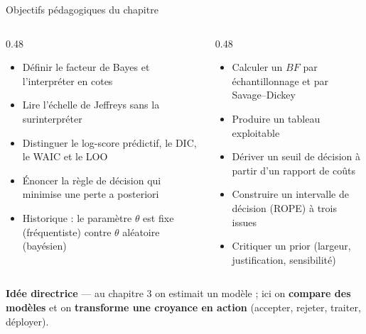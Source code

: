 \begin{frame}{Objectifs pédagogiques du chapitre}
\begin{columns}[t]
\begin{column}{0.48\textwidth}
\begin{kbox}[Savoirs]
\begin{itemize}
  \item Définir le facteur de Bayes et l'interpréter en cotes
  \item Lire l'échelle de Jeffreys sans la surinterpréter
  \item Distinguer le log-score prédictif, le DIC, le WAIC et le LOO
  \item Énoncer la règle de décision qui minimise une perte a posteriori
  \item Historique : le paramètre $\theta$ est fixe (fréquentiste) contre $\theta$ aléatoire (bayésien)
\end{itemize}
\end{kbox}
\end{column}
\begin{column}{0.48\textwidth}
\begin{abox}
\begin{itemize}
  \item Calculer un $BF$ par échantillonnage et par Savage--Dickey
  \item Produire un tableau  exploitable
  \item Dériver un seuil de décision à partir d'un rapport de coûts
  \item Construire un intervalle de décision (ROPE) à trois issues
  \item Critiquer un prior (largeur, justification, sensibilité)
\end{itemize}
\end{abox}
\end{column}
\end{columns}
\vspace{1mm}
\begin{tcolorbox}[colback=byLight,colframe=byGrey!50,arc=2mm,width=.95\textwidth]
\centering\small
\textbf{Idée directrice} --- au chapitre 3 on estimait un modèle ; ici on
\textbf{compare des modèles} et on \textbf{transforme une croyance en action}
(accepter, rejeter, traiter, déployer).
\end{tcolorbox}
\end{frame}

